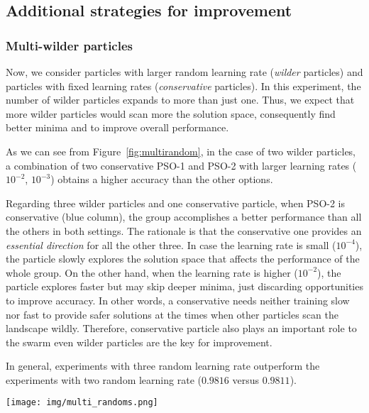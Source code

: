 \documentclass{ieeeaccess}
\begin{document}
\subsection{Additional strategies for improvement}
\subsubsection{Multi-wilder particles}
Now, we consider particles with larger random learning rate (\emph{wilder} particles) and particles with fixed learning rates (\emph{conservative} particles). In this experiment, the number of wilder particles expands to more than just one. Thus, we expect that more wilder particles would scan more the solution space, consequently find better minima and to improve overall performance.


As we can see from Figure~\ref{fig:multirandom}, in the case of two wilder particles, a combination of two conservative PSO-1 and PSO-2 with larger learning rates ($10^{-2}$, $10^{-3}$) obtains a higher accuracy than the other options.

Regarding three wilder particles and one conservative particle, when PSO-2 is conservative (blue column), the group accomplishes a better performance than all the others in both settings. The rationale is that the conservative one provides an \emph{essential direction} for all the other three. In case the learning rate is small ($10^{-4}$), the particle slowly explores the solution space that affects the performance of the whole group. On the other hand, when the learning rate is higher ($10^{-2}$), the particle explores faster but may skip deeper minima, just discarding opportunities to improve accuracy. In other words, a conservative needs neither training slow nor fast to provide safer solutions at the times when other particles scan the landscape wildly. Therefore, conservative particle also plays an important role to the swarm even wilder particles are the key for improvement.

In general, experiments with three random learning rate outperform the experiments with two random learning rate ($0.9816$ versus $0.9811$).
\begin{figure*}[htb!]
\begin{center}
\texttt{[image: img/multi\_randoms.png]}
\caption{Multi-random learning rates. The accuracy for experiments with two and three random particles. The latter is tested in two different settings. In each experiment, the columns from left to right hand side indicate PSO-1, PSO-2, PSO-3 and PSO-4 in order. When PSO-1, PSO-2 and PSO-3 are conservative the learning rates are set at $10^{-2}$, $10^{-3}$ and $10^{-4}$, respectively. The PSO-4’s learning rate is always in a random range. Green columns denote random PSOs whereas blue columns represent conservative ones.}
\label{fig:multirandom}
\end{center}
\end{figure*}
\end{document}
